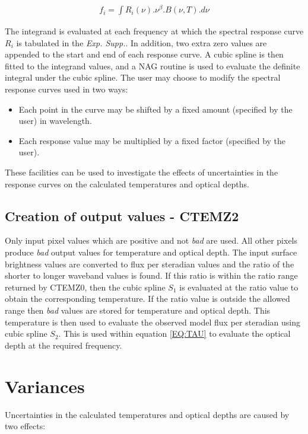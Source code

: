 \begin{eqnarray*}
f_{i} = \int R_{i}(\nu).\nu^{\beta}.B( \nu, T ).d\nu
\end{eqnarray*}
 
The integrand is evaluated at each frequency at which the spectral response 
curve $R_{i}$ is tabulated in the {\em Exp. Supp.}. In addition, two extra 
zero values are appended to the start and end of each response curve. A cubic
spline is then fitted to the integrand values, and a {\small NAG} routine is
used to evaluate the definite integral under the cubic spline. The user may 
choose to modify the spectral response curves used in two ways:

\begin{itemize}
\item Each point in the curve may be shifted by a fixed amount (specified by the 
user) in wavelength.
\item Each response value may be multiplied by a fixed factor (specified by the 
user).
\end{itemize}

These facilities can be used to investigate the effects of uncertainties in the
response curves on the calculated temperatures and optical depths. 

\subsection{Creation of output values - CTEMZ2}
Only input pixel values which are positive and not {\em bad} are used. All other
pixels produce {\em bad} output values for temperature and optical depth. The
input surface brightness values are converted to flux per steradian values and
the ratio of the shorter to longer waveband values is found. If this ratio is
within the ratio range returned by {\small CTEMZ0}, then the cubic spline
$S_{1}$ is evaluated at the ratio value to obtain the corresponding temperature.
If the ratio value is outside the allowed range then {\em bad} values are stored
for temperature and optical depth. This temperature is then used to evaluate the
observed model flux per steradian using cubic spline $S_{2}$. This is used
within equation \ref{EQ:TAU} to evaluate the optical depth at the required
frequency. 

\section{Variances}
Uncertainties in the calculated temperatures and optical depths are caused by 
two effects:

